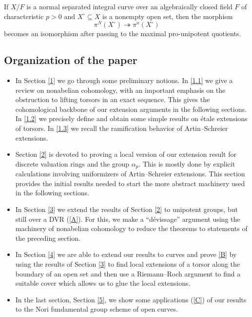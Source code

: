 \documentclass[a4paper,english,12pt]{amsart}
\numberwithin{equation}{section}
\newenvironment{customthm}[1]
  {\renewcommand\theinnercustomthm{#1}\innercustomthm}
  {\endinnercustomthm}
\renewcommand{\_}{\rule{0.25cm}{0.4pt}}
\begin{document}
\begin{customthm}{Theorem C}[Theorem \ref{unipotent fundamental group iso}]\label{C}
If $X/F$ is a normal separated integral curve over an algebraically closed field $F$ of characteristic $p>0$ and $X^\circ\subseteq X$ is a nonempty open set, then the morphism
\[
\pi^{N}(X^{\circ})\twoheadrightarrow \pi^{n}(X^{\circ})
\]
becomes an isomorphism after passing to the maximal pro-unipotent quotients.
\end{customthm}

\subsection*{Organization of the paper}
\begin{itemize}
    \item In Section \ref{1} we go through some preliminary notions. In \ref{1.1} we give a review on nonabelian cohomology, with an important emphasis on the obstruction to lifting torsors in an exact sequence. This gives the cohomological backbone of our extension arguments in the following sections. In \ref{1.2} we precisely define and obtain some simple results on étale extensions of torsors. In \ref{1.3} we recall the ramification behavior of Artin--Schreier extensions.
    \item Section \ref{2} is devoted to proving a local version of our extension result for discrete valuation rings and the group $\alpha_{p}$. This is mostly done by explicit calculations involving uniformizers of Artin--Schreier extensions. This section provides the initial results needed to start the more abstract machinery used in the following sections.
    \item In Section \ref{3} we extend the results of Section \ref{2} to unipotent groups, but still over a DVR (\ref{A}). For this, we make a ``dévissage'' argument using the machinery of nonabelian cohomology to reduce the theorems to statements of the preceding section.
    \item In Section \ref{4} we are able to extend our results to curves and prove \ref{B} by using the results of Section \ref{3} to find local extensions of a torsor along the boundary of an open set and then use a Riemann--Roch argument to find a suitable cover which allows us to glue the local extensions.
    \item In the last section, Section \ref{5}, we show some applications (\ref{C}) of our results to the Nori fundamental group scheme of open curves.
\end{itemize}
\end{document}

